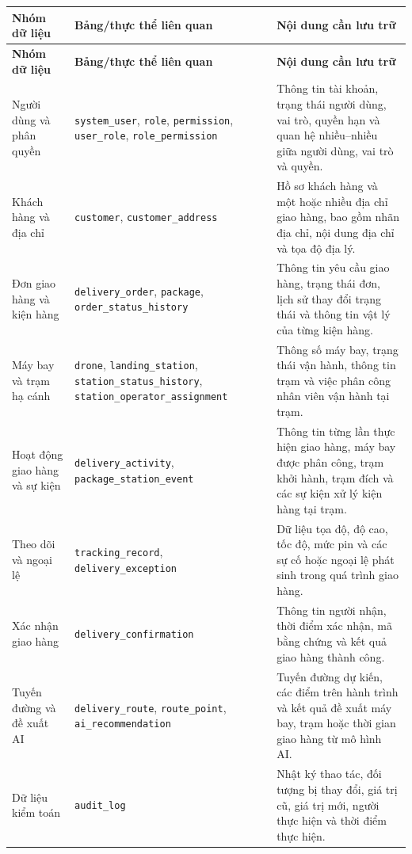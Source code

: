 \renewcommand{\arraystretch}{1.2}
\begin{longtable}{|p{3.8cm}|p{6cm}|p{5.8cm}|}
\hline
\textbf{Nhóm dữ liệu} & 
\textbf{Bảng/thực thể liên quan} &
\textbf{Nội dung cần lưu trữ} \\ \hline
\endfirsthead

\hline
\textbf{Nhóm dữ liệu} &
\textbf{Bảng/thực thể liên quan} &
\textbf{Nội dung cần lưu trữ} \\ \hline
\endhead

Người dùng và phân quyền &
\texttt{system\_user}, \texttt{role}, \texttt{permission},
\texttt{user\_role}, \texttt{role\_permission} &
Thông tin tài khoản, trạng thái người dùng, vai trò, quyền hạn và quan hệ
nhiều--nhiều giữa người dùng, vai trò và quyền. \\ \hline

Khách hàng và địa chỉ &
\texttt{customer}, \texttt{customer\_address} &
Hồ sơ khách hàng và một hoặc nhiều địa chỉ giao hàng, bao gồm nhãn địa
chỉ, nội dung địa chỉ và tọa độ địa lý. \\ \hline

Đơn giao hàng và kiện hàng &
\texttt{delivery\_order}, \texttt{package},
\texttt{order\_status\_history} &
Thông tin yêu cầu giao hàng, trạng thái đơn, lịch sử thay đổi trạng thái
và thông tin vật lý của từng kiện hàng. \\ \hline

Máy bay và trạm hạ cánh &
\texttt{drone}, \texttt{landing\_station},
\texttt{station\_status\_history},
\texttt{station\_operator\_assignment} &
Thông số máy bay, trạng thái vận hành, thông tin trạm và việc phân công
nhân viên vận hành tại trạm. \\ \hline

Hoạt động giao hàng và sự kiện &
\texttt{delivery\_activity}, \texttt{package\_station\_event} &
Thông tin từng lần thực hiện giao hàng, máy bay được phân công, trạm
khởi hành, trạm đích và các sự kiện xử lý kiện hàng tại trạm. \\ \hline

Theo dõi và ngoại lệ &
\texttt{tracking\_record}, \texttt{delivery\_exception} &
Dữ liệu tọa độ, độ cao, tốc độ, mức pin và các sự cố hoặc ngoại lệ phát
sinh trong quá trình giao hàng. \\ \hline

Xác nhận giao hàng &
\texttt{delivery\_confirmation} &
Thông tin người nhận, thời điểm xác nhận, mã bằng chứng và kết quả giao
hàng thành công. \\ \hline

Tuyến đường và đề xuất AI &
\texttt{delivery\_route}, \texttt{route\_point},
\texttt{ai\_recommendation} &
Tuyến đường dự kiến, các điểm trên hành trình và kết quả đề xuất máy
bay, trạm hoặc thời gian giao hàng từ mô hình AI. \\ \hline

Dữ liệu kiểm toán &
\texttt{audit\_log} &
Nhật ký thao tác, đối tượng bị thay đổi, giá trị cũ, giá trị mới, người
thực hiện và thời điểm thực hiện. \\ \hline

\end{longtable}
\renewcommand{\arraystretch}{1}



